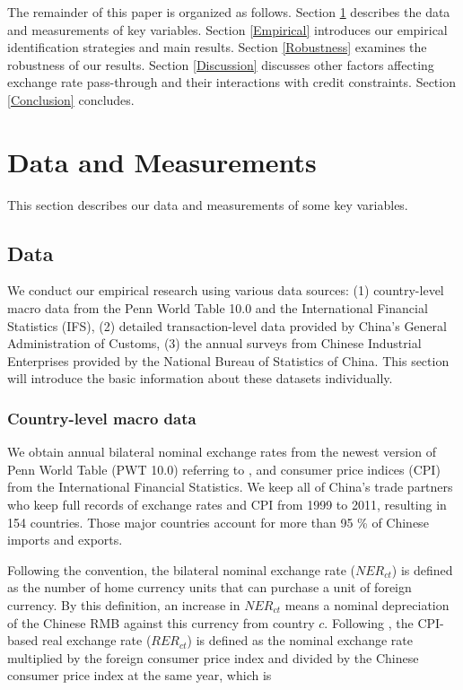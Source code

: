 \documentclass[12pt]{article}
\begin{document}
The remainder of this paper is organized as follows. Section \ref{Data&Measurements} describes the data and measurements of key variables. Section \ref{Empirical} introduces our empirical identification strategies and main results. Section \ref{Robustness} examines the robustness of our results.  Section \ref{Discussion} discusses other factors affecting exchange rate pass-through and their interactions with credit constraints. Section \ref{Conclusion} concludes.

\section{Data and Measurements} \label{Data&Measurements}

This section describes our data and measurements of some key variables.

\subsection{Data} \label{Data}

We conduct our empirical research using various data sources: (1) country-level macro data from the Penn World Table 10.0 and the International Financial Statistics (IFS), (2) detailed transaction-level data provided by China’s General Administration of Customs, (3) the annual surveys from Chinese Industrial Enterprises provided by the National Bureau of Statistics of China.  This section will introduce the basic information about these datasets individually.

\subsubsection{Country-level macro data} \label{Data-Macro}

We obtain annual bilateral nominal exchange rates from the newest version of Penn World Table (PWT 10.0) referring to \cite{feenstra2015}, and consumer price indices (CPI) from the International Financial Statistics. We keep all of China's trade partners who keep full records of exchange rates and CPI from 1999 to 2011, resulting in 154 countries. Those major countries account for more than 95 \% of Chinese imports and exports.

Following the convention, the bilateral nominal exchange rate ($NER_{ct}$) is defined as the number of home currency units that can purchase a unit of foreign currency. By this definition, an increase in $NER_{ct}$ means a nominal depreciation of the Chinese RMB against this currency from country $c$. Following \cite{lmx2015}, the CPI-based real exchange rate ($RER_{ct}$) is defined as the nominal exchange rate multiplied by the foreign consumer price index and divided by the Chinese consumer price index at the same year, which is
\end{document}
